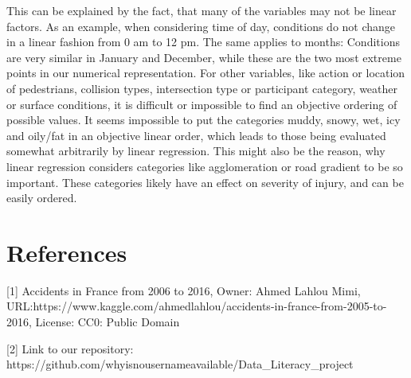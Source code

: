 \documentclass{article}
\begin{document}
This can be explained by the fact, that many of the variables may not be linear factors. As an example, when considering time of day, conditions do not change in a linear fashion from 0 am to 12 pm. The same applies to months: Conditions are very similar in January and December, while these are the two most extreme points in our numerical representation. For other variables, like action or location of pedestrians, collision types, intersection type or participant category, weather or surface conditions, it is difficult or impossible to find an objective ordering of possible values. It seems impossible to put the categories muddy, snowy, wet, icy and oily/fat in an objective linear order, which leads to those being evaluated somewhat arbitrarily by linear regression. This might also be the reason, why linear regression considers categories like agglomeration or road gradient to be so important. These categories likely have an effect on severity of injury, and can be easily ordered.

\medskip
\section*{References}
{
\small
[1] Accidents in France from 2006 to 2016,
Owner: Ahmed Lahlou Mimi,
URL:https://www.kaggle.com/ahmedlahlou/accidents-in-france-from-2005-to-2016,
License: CC0: Public Domain

[2] Link to our repository: https://github.com/whyisnousernameavailable/Data\_Literacy\_project
}
\end{document}

